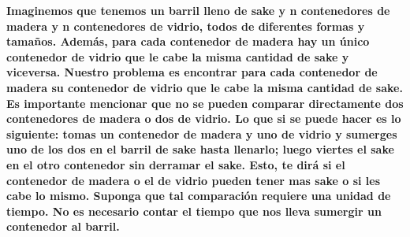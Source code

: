 \textbf{Imaginemos que tenemos un barril lleno de sake y n contenedores de madera y n contenedores de vidrio, todos de diferentes formas y tamaños. Además, para cada contenedor de madera hay un único contenedor de vidrio que le cabe la misma cantidad de sake y viceversa. Nuestro problema es encontrar para cada contenedor de madera su contenedor de vidrio que le cabe la misma cantidad de sake. Es importante mencionar que no se pueden comparar directamente dos contenedores de madera o dos de vidrio. Lo que si se puede hacer es lo siguiente: tomas un contenedor de madera y uno de vidrio y sumerges uno de los dos en el barril de sake hasta llenarlo; luego viertes el sake en el otro contenedor sin derramar el sake. Esto, te dirá si el contenedor de madera o el de vidrio pueden tener mas sake o si les cabe lo mismo. Suponga que tal comparación requiere una unidad de tiempo. No es necesario contar el tiempo que nos lleva sumergir un contenedor al barril.}\\